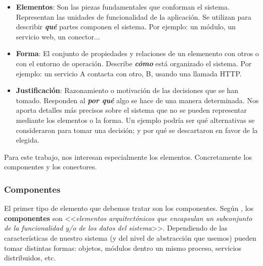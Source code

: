     \begin{itemize}
        \item \textbf{Elementos}: Son las piezas fundamentales que conforman el sistema. Representan las unidades de funcionalidad de la aplicación. Se utilizan para describir \textbf{\emph{qué}} partes componen el sistema. Por ejemplo: un módulo, un servicio web, un conector...

        \item \textbf{Forma}: El conjunto de propiedades y relaciones de un elemenento con otros o con el entorno de operación. Describe \textbf{\emph{cómo}} está organizado el sistema. Por ejemplo: un servicio A contacta con otro, B, usando una llamada HTTP.

        \item \textbf{Justificación}: Razonamiento o motivación de las decisiones que se han tomado. Responden al \textbf{\emph{por qué}} algo se hace de una manera determinada. Nos aporta detalles más precisos sobre el sistema que no se pueden representar mediante los elementos o la forma. Un ejemplo podría ser qué alternativas se consideraron para tomar una decisión; y por qué se descartaron en favor de la elegida.

    \end{itemize}

Para este trabajo, nos interesan especialmente los elementos. Concretamente los componentes y los conectores.

\subsubsection{Componentes}

El primer tipo de elemento que debemos tratar son los componentes. Según \cite{taylorSoftwareArchitectureFoundations2009}, los \textbf{componentes} son <<\emph{elementos arquitectónicos que encapsulan un subconjunto de la funcionalidad y/o de los datos del sistema}>>. Dependiendo de las características de nuestro sistema (y del nivel de abstracción que usemos) pueden tomar distintas formas: objetos, módulos dentro un mismo proceso, servicios distribuidos, etc.

